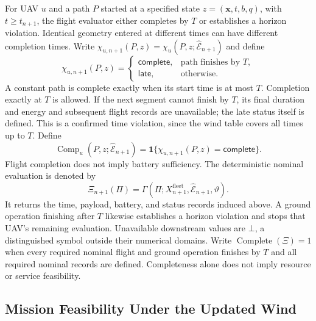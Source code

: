 For UAV $u$ and a path $P$ started at a specified state
$z=(\mathbf x,t,b,q)$, with $t\ge t_{n+1}$, the flight evaluator
either completes by $T$ or establishes a horizon violation. Identical
geometry entered at different times can have different completion times.
Write $\chi_{u,n+1}(P,z)=\chi_u(P,z;\widehat{\mathcal E}_{n+1})$ and define
\begin{equation}
\chi_{u,n+1}(P,z)=
\begin{cases}
\mathsf{complete},&\text{path finishes by }T,\\
\mathsf{late},&\text{otherwise}.
\end{cases}
\label{eq:flight_status}
\end{equation}
A constant path is complete exactly when its start time is at most $T$.
Completion exactly at $T$ is allowed. If the next segment cannot finish
by $T$, its final duration and energy and subsequent flight records are
unavailable; the late status itself is defined. This is a confirmed time
violation, since the wind table covers all times up to $T$.
Define
\begin{equation}
\operatorname{Comp}_u(P,z;\widehat{\mathcal E}_{n+1})
=\mathbf 1\{\chi_{u,n+1}(P,z)=\mathsf{complete}\}.
\label{eq:flight_completion}
\end{equation}
Flight completion does not imply battery sufficiency.
The deterministic nominal evaluation is denoted by
\begin{equation}
\Xi_{n+1}(\Pi)=
\Gamma(\Pi;X_{n+1}^{\mathrm{fleet}},\widehat{\mathcal E}_{n+1},\vartheta).
\label{eq:induced_execution_state}
\end{equation}
It returns the time, payload, battery, and status records induced
above. A ground operation finishing after $T$ likewise establishes a
horizon violation and stops that UAV's remaining evaluation. Unavailable
downstream values are $\bot$, a distinguished symbol outside their
numerical domains. Write $\operatorname{Complete}(\Xi)=1$ when every
required nominal flight and ground operation finishes by $T$ and all
required nominal records are defined. Completeness alone does not imply
resource or service feasibility.

\subsection{Mission Feasibility Under the Updated Wind}
\label{subsec:hard_feasibility}

